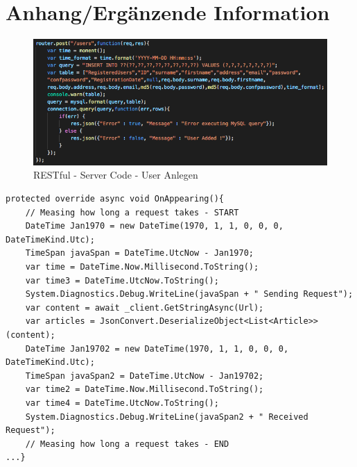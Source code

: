 %
%
% 
% 
\renewcommand*{\lstlistlistingname}{Codeverzeichnis}
\chapter{Anhang/Ergänzende Information}
\label{chap:app}
	\begin{figure}[h!]
		\centering
		\includegraphics[width=1\textwidth]{images/restfull-server-code.png}
		\caption{RESTful - Server Code - User Anlegen}
		\label{fig:serversidecode}
	\end{figure}

	\begin{lstlisting}[caption={Messung der Kommunikationszeit - MCKB PCL},label={lst:measurecom},captionpos=b,style=csharp]
protected override async void OnAppearing(){
    // Measing how long a request takes - START
    DateTime Jan1970 = new DateTime(1970, 1, 1, 0, 0, 0, DateTimeKind.Utc);
    TimeSpan javaSpan = DateTime.UtcNow - Jan1970;
    var time = DateTime.Now.Millisecond.ToString();
    var time3 = DateTime.UtcNow.ToString();
    System.Diagnostics.Debug.WriteLine(javaSpan + " Sending Request");
    var content = await _client.GetStringAsync(Url);
    var articles = JsonConvert.DeserializeObject<List<Article>>(content);
    DateTime Jan19702 = new DateTime(1970, 1, 1, 0, 0, 0, DateTimeKind.Utc);
    TimeSpan javaSpan2 = DateTime.UtcNow - Jan19702;
    var time2 = DateTime.Now.Millisecond.ToString();
    var time4 = DateTime.UtcNow.ToString();
    System.Diagnostics.Debug.WriteLine(javaSpan2 + " Received Request");
    // Measing how long a request takes - END
...}
	\end{lstlisting}

